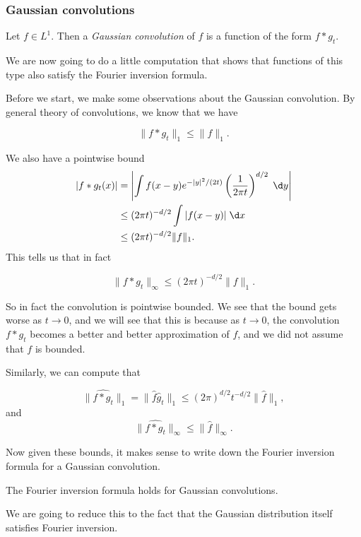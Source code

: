 \documentclass[a4paper]{article}
\begin{document}
\subsubsection*{Gaussian convolutions}
\begin{defi}
  Let $f \in L^1$. Then a \emph{Gaussian convolution} of $f$ is a function of the form $f * g_t$.
\end{defi}

We are now going to do a little computation that shows that functions of this type also satisfy the Fourier inversion formula.

Before we start, we make some observations about the Gaussian convolution. By general theory of convolutions, we know that we have
\begin{prop}
  \[
    \|f * g_t\|_1 \leq \|f\|_1.
  \]
\end{prop}
We also have a pointwise bound
\begin{align*}
  |f*g_t(x)| &= \left|\int f(x - y) e^{-|y|^2/(2t)} \left(\frac{1}{2\pi t}\right)^{d/2} \;\d y\right| \\
  &\leq (2\pi t)^{-d/2} \int |f(x - y)| \;\d x\\
  &\leq (2\pi t)^{-d/2} \|f\|_1.
\end{align*}
This tells us that in fact
\begin{prop}
  \[
    \|f * g_t\|_\infty \leq (2\pi t)^{-d/2} \|f\|_1.
  \]
\end{prop}
So in fact the convolution is pointwise bounded. We see that the bound gets worse as $t \to 0$, and we will see that this is because as $t \to 0$, the convolution $f * g_t$ becomes a better and better approximation of $f$, and we did not assume that $f$ is bounded.

Similarly, we can compute that
\begin{prop}
  \[
    \|\widehat{f * g_t}\|_1 = \|\hat{f} \hat{g}_t\|_1 \leq (2\pi)^{d/2} t^{-d/2}\|\hat{f}\|_1,
  \]
  and
  \[
    \|\widehat{f * g_t}\|_\infty \leq \|\hat{f}\|_\infty.
  \]
\end{prop}
Now given these bounds, it makes sense to write down the Fourier inversion formula for a Gaussian convolution.
\begin{lemma}
  The Fourier inversion formula holds for Gaussian convolutions.
\end{lemma}

We are going to reduce this to the fact that the Gaussian distribution itself satisfies Fourier inversion.
\end{document}
